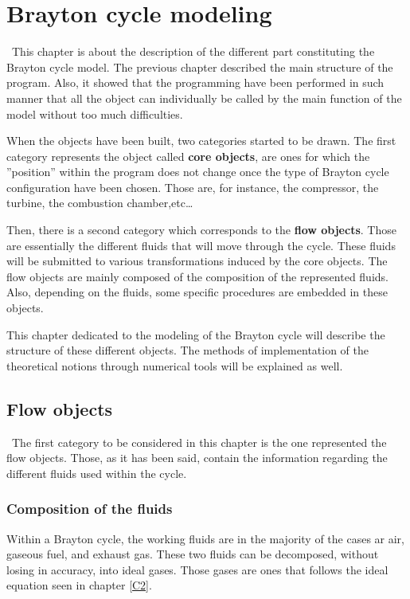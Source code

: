 \graphicspath{{Chapitre_7/Images/}}
\chapter{Brayton cycle modeling}\label{C7}
\quad\, This chapter is about the description of the different part constituting the Brayton cycle model. The previous chapter described the main structure of the program. Also, it showed that the programming have been performed in such manner that all the object can individually be called by the main function of the model without too much difficulties.

When the objects have been built, two categories started to be drawn. The first category represents the object called \textbf{core objects}, are ones for which the ''position'' within the program does not change once the type of Brayton cycle configuration have been chosen. Those are, for instance, the compressor, the turbine, the combustion chamber,etc\dots

Then, there is a second category which corresponds to the \textbf{flow objects}. Those are essentially the different fluids that will move through the cycle. These fluids will be submitted to various transformations induced by the core objects. The flow objects are mainly composed of the composition of the represented fluids. Also, depending on the fluids, some specific procedures are embedded in these objects.

This chapter dedicated to the modeling of the Brayton cycle will describe the structure of these different objects. The methods of implementation of the theoretical notions through numerical tools will be explained as well.

\section{Flow objects}
\quad\ The first category to be considered in this chapter is the one represented the flow objects. Those, as it has been said, contain the information regarding the different fluids used within the cycle.

\subsection{Composition of the fluids}
Within a Brayton cycle, the working fluids are in the majority of the cases ar air, gaseous fuel, and exhaust gas. These two fluids can be decomposed, without losing in accuracy, into ideal gases. Those gases are ones that follows the ideal equation seen in chapter \ref{C2}. 


